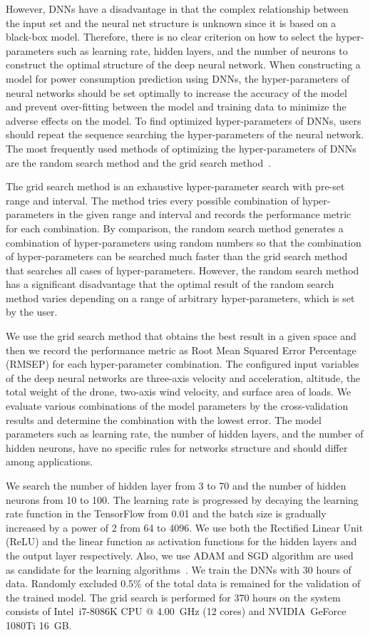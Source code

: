 \documentclass[journal]{./template/IEEEtran}
\begin{document}
However, DNNs have a disadvantage in that the complex relationship between the input set and the neural net structure is unknown since it is based on a black-box model. 
Therefore, there is no clear criterion on how to select the hyper-parameters such as learning rate, hidden layers, and the number of neurons to construct the optimal structure of the deep neural network. 
When constructing a model for power consumption prediction using DNNs, the hyper-parameters of neural networks should be set optimally to increase the accuracy of the model and prevent over-fitting between the model and training data to minimize the adverse effects on the model.
To find optimized hyper-parameters of DNNs, users should repeat the sequence searching the hyper-parameters of the neural network. 
The most frequently used methods of optimizing the hyper-parameters of DNNs are the random search method and the grid search method~\cite{ref_16}. 

The grid search method is an exhaustive hyper-parameter search with pre-set range and interval. The method tries every possible combination of hyper-parameters in the given range and interval and records the performance metric for each combination. 
By comparison, the random search method generates a combination of hyper-parameters using random numbers so that the combination of hyper-parameters can be searched much faster than the grid search method that searches all cases of hyper-parameters. However, the random search method has a significant disadvantage that the optimal result of the random search method varies depending on a range of arbitrary hyper-parameters, which is set by the user.

We use the grid search method that obtains the best result in a given space and then we record the performance metric as Root Mean Squared Error Percentage (RMSEP) for each hyper-parameter combination.
The configured input variables of the deep neural networks are three-axis velocity and acceleration, altitude, the total weight of the drone, two-axis wind velocity, and surface area of loads. 
We evaluate various combinations of the model parameters by the cross-validation results and determine the combination with the lowest error. 
The model parameters such as learning rate, the number of hidden layers, and the number of hidden neurons, have no specific rules for networks structure and should differ among applications. 

We search the number of hidden layer from 3 to 70 and the number of hidden neurons from 10 to 100. 
The learning rate is progressed by decaying the learning rate function in the TensorFlow from 0.01 and the batch size is gradually increased by a power of 2 from 64 to 4096.
We use both the Rectified Linear Unit (ReLU) and the linear function as activation functions for the hidden layers and the output layer respectively. 
Also, we use ADAM and SGD algorithm are used as candidate for the learning algorithms~\cite{ref_17}. 
We train the DNNs with 30 hours of data. Randomly excluded 0.5\% of the total data is remained for the validation of the trained model.
The grid search is performed for 370 hours on the system consists of Intel\textregistered ~i7-8086K CPU @ 4.00~GHz (12 cores) and NVIDIA\textregistered ~GeForce 1080Ti 16~GB.
\end{document}
